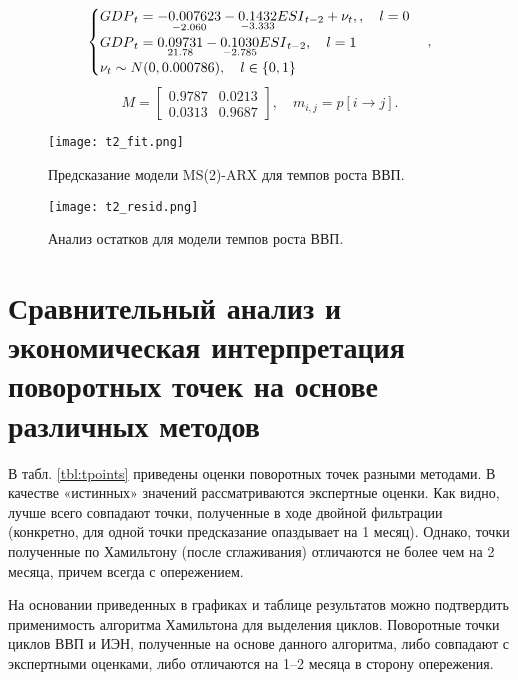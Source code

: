 \documentclass[../report.tex]{subfiles}
\begin{document}
	
	{
	\begin{equation}
		\label{eq:ms2varx}
		\begin{cases}
			{GDP}_{t} = 
				\underset{-2.060}{-0.007623} 
				- \underset{-3.333}{0.1432} {ESI}_{t-2}
				+ \nu_{t} , \space 
				, \quad l=0 \\
			{GDP}_{t} = 
				\underset{21.78}{0.09731}
				- \underset{-2.785}{0.1030} {ESI}_{t-2}
				, \quad l=1 \\
			\nu_{t} \sim N(0, 0.000786) , \quad l \in \{0, 1\}
		\end{cases},
	\end{equation}
	\begin{equation}
		\label{eq:ms2varx_m}
		M = 
			\begin{bmatrix}
			0.9787 & 0.0213 \\
			0.0313 & 0.9687
			\end{bmatrix}
		, \quad m_{i,j} = p[i \rightarrow j]
		.
	\end{equation}		
	}
		
	{
		\begin{figure}
			\texttt{[image: t2\_fit.png]}
			\caption{Предсказание модели MS(2)-ARX для темпов роста ВВП.}
			\label{fig:hp-fitcompare2}
		\end{figure}
		\begin{figure}
			\texttt{[image: t2\_resid.png]}
			\caption{Анализ остатков для модели темпов роста ВВП.}
			\label{fig:hp-residcompare2}
		\end{figure}
	}
	
	\section{Сравнительный анализ и экономическая интерпретация поворотных точек на основе различных методов }
	
	
	В табл. \ref{tbl:tpoints} приведены оценки поворотных точек разными методами. В качестве «истинных» значений рассматриваются экспертные оценки. Как видно, лучше всего совпадают точки, полученные в ходе двойной фильтрации (конкретно, для одной точки предсказание опаздывает на 1 месяц). Однако, точки полученные по Хамильтону (после сглаживания) отличаются не более чем на 2 месяца, причем всегда с опережением.
	
	На основании приведенных в графиках и таблице результатов можно подтвердить применимость алгоритма Хамильтона для выделения циклов. Поворотные точки циклов ВВП и ИЭН, полученные на основе данного алгоритма, либо совпадают с экспертными оценками, либо отличаются на 1–2 месяца в сторону опережения.
	
\end{document}
